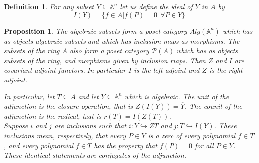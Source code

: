 \documentclass{article}
\theoremstyle{problemstyle}
\newtheorem{definition}{Definition}
\newtheorem{proposition}{Proposition}
\begin{document}
\begin{definition}
For any subset $Y \subseteq \mathbb{A}^n$ let us define the ideal of $Y$ in $A$ by $$I(Y) = \{f \in A | f(P) = 0  \ \ \forall P \in Y\}$$ 
\end{definition}

\begin{proposition}
The algebraic subsets form a poset category $Alg(\mathbb{A}^n)$ which has as objects algebraic subsets and which has inclusion maps as morphisms. The subsets of the ring $A$ also form a poset category $\mathcal{P}(A)$ which has as objects subsets of the ring, and morphisms given by inclusion maps. Then $Z$ and $I$ are covariant adjoint functors. In particular $I$ is the left adjoint and $Z$ is the right adjoint.  

\begin{center}
\end{center}

In particular, let $T \subseteq A$ and let $Y \subseteq  \mathbb{A}^n$ which is algebraic. The unit of the adjunction is the closure operation, that is $Z(I(Y)) = \overline{Y}$. The counit of the adjunction is the radical, that is $r(T) = I(Z(T))$.\\

Suppose $i$ and $j$ are inclusions such that $i:Y \hookrightarrow ZT$ and $j:T \hookrightarrow I(Y)$. These inclusions mean, respectively, that every $P \in Y$ is a zero of every polynomial $f \in T$, and every polynomial $f \in T$ has the property that $f(P) = 0$ for all $P \in Y$. These identical statements are conjugates of the adjunction. 
\end{proposition}
\end{document}
